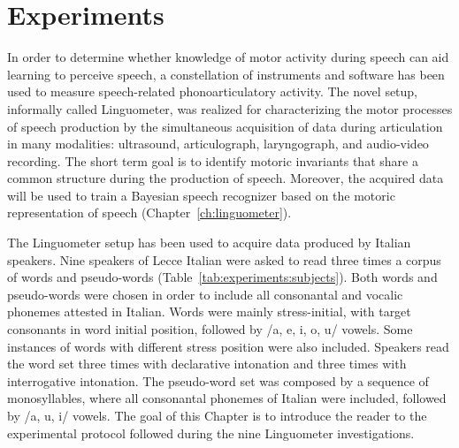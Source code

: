 \chapter{Experiments}
\label{ch:experiments}
In order to determine whether knowledge of motor activity during speech
can aid learning to perceive speech, a constellation of instruments and
software has been used to measure speech-related phonoarticulatory activity.
The novel setup, informally called Linguometer, was realized for characterizing 
the motor processes of speech production by the simultaneous acquisition of data
during articulation in many modalities: ultrasound, articulograph,
laryngograph, and audio-video recording. 
The short term goal is to identify motoric invariants that share a common 
structure during the production of speech.
Moreover, the acquired data will be used to train a Bayesian speech recognizer
based on the motoric representation of speech (Chapter~\ref{ch:linguometer}).


The Linguometer setup has been used to acquire data produced by Italian
speakers. 
Nine speakers of Lecce Italian were asked to read three times a corpus of words
and pseudo-words (Table~\ref{tab:experiments:subjects}).
Both words and pseudo-words were chosen in order to include all consonantal and
vocalic phonemes attested in Italian. 
Words were mainly stress-initial, with target consonants in word initial 
position, followed by /a, e, i, o, u/ vowels. 
Some instances of words with different stress position were also included.
Speakers read the word set three times with declarative intonation and three 
times with interrogative intonation. 
The pseudo-word set was composed by a sequence of monosyllables, where all 
consonantal phonemes of Italian were included, followed by /a, u, i/ vowels. 
The goal of this Chapter is to introduce the reader to the experimental protocol
followed during the nine Linguometer investigations.
